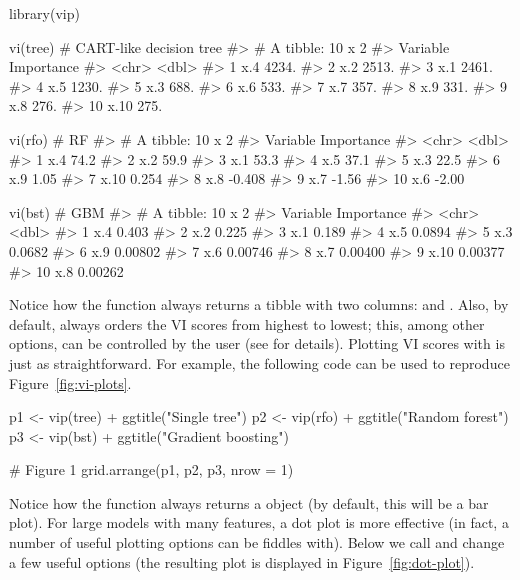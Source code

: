 \begin{example}
library(vip)

vi(tree)  # CART-like decision tree
#> # A tibble: 10 x 2
#>    Variable Importance
#>    <chr>         <dbl>
#>  1 x.4           4234.
#>  2 x.2           2513.
#>  3 x.1           2461.
#>  4 x.5           1230.
#>  5 x.3            688.
#>  6 x.6            533.
#>  7 x.7            357.
#>  8 x.9            331.
#>  9 x.8            276.
#> 10 x.10           275.

vi(rfo)   # RF
#> # A tibble: 10 x 2
#>    Variable Importance
#>    <chr>         <dbl>
#>  1 x.4          74.2  
#>  2 x.2          59.9  
#>  3 x.1          53.3  
#>  4 x.5          37.1  
#>  5 x.3          22.5  
#>  6 x.9           1.05 
#>  7 x.10          0.254
#>  8 x.8          -0.408
#>  9 x.7          -1.56 
#> 10 x.6          -2.00

vi(bst)   # GBM
#> # A tibble: 10 x 2
#>    Variable Importance
#>    <chr>         <dbl>
#>  1 x.4         0.403  
#>  2 x.2         0.225  
#>  3 x.1         0.189  
#>  4 x.5         0.0894 
#>  5 x.3         0.0682 
#>  6 x.9         0.00802
#>  7 x.6         0.00746
#>  8 x.7         0.00400
#>  9 x.10        0.00377
#> 10 x.8         0.00262
\end{example}


Notice how the  function always returns a tibble with two columns:  and . Also, by default,  always orders the VI scores from highest to lowest; this, among other options, can be controlled by the user (see  for details). Plotting VI scores with  is just as straightforward. For example, the following code can be used to reproduce Figure~\ref{fig:vi-plots}.

\begin{example}
p1 <- vip(tree) + ggtitle("Single tree")
p2 <- vip(rfo) + ggtitle("Random forest")
p3 <- vip(bst) + ggtitle("Gradient boosting")

# Figure 1
grid.arrange(p1, p2, p3, nrow = 1)
\end{example}

Notice how the  function always returns a  object (by default, this will be a bar plot). For large models with many features, a dot plot is more effective (in fact, a number of useful plotting options can be fiddles with). Below we call  and change a few useful options (the resulting plot is displayed in Figure~\ref{fig:dot-plot}).

